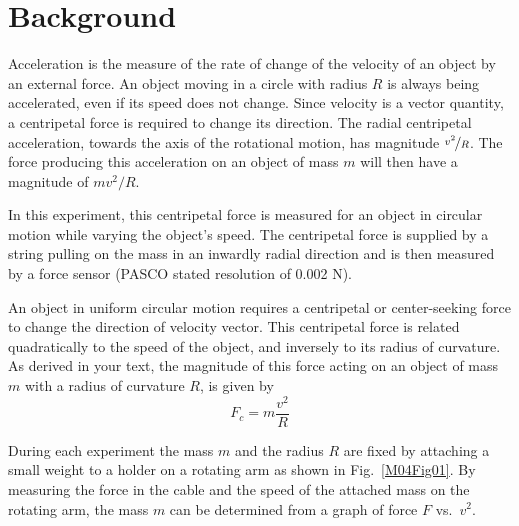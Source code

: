 
\label{lab:M4}



\section{Background}

Acceleration is the measure of the rate of change of the velocity of an object by an external force.  An object moving in a circle with radius $R$ is always being accelerated, even if its speed does not change.  Since velocity is a vector quantity, a centripetal force is required to change its direction. The radial centripetal acceleration, towards the axis of the rotational motion, has magnitude $\nicefrac{v^{2}}{R}$.  The force producing this acceleration on an object of mass $m$ will then have a magnitude of $m v^{2} / R$.

In this experiment, this centripetal force is measured for an object in circular motion while varying the object's speed.  The centripetal force is supplied by a string pulling on the mass in an inwardly radial direction and is then measured by a force sensor (PASCO stated resolution of 0.002 N).



An object in uniform circular motion requires a centripetal or center-seeking force to change the direction of velocity vector.  This centripetal force is related quadratically to the speed of the object, and inversely to its radius of curvature.  As derived in your text, the magnitude of this force acting on an object of mass $m$ with a radius of curvature $R$, is given by
\begin{equation}
  F_{c} = m \frac{v^2}{R}
\end{equation}

During each experiment the mass $m$ and the radius $R$ are fixed by attaching a small weight to a holder on a rotating arm as shown in Fig.~\ref{M04Fig01}. By measuring the force in the cable and the speed of the attached mass on the rotating arm, the mass $m$ can be determined from a graph of force $F$ vs.\ $v^2$.

